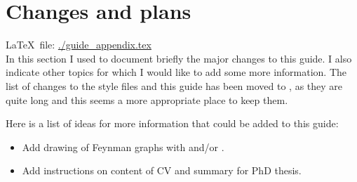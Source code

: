 
\chapter{Changes and plans}%
\label{sec:app:changes}

\LaTeX\ file: \url{./guide_appendix.tex}\\[1ex]
\noindent
In this section I used to document briefly the major changes to this guide.
I also indicate other topics for which I would like to add some more information.
The list of changes to the style files and this guide has been moved to ,
as they are quite long and this seems a more appropriate place to keep them.

Here is a list of ideas for more information that could be added to
this guide:
\begin{itemize}
\item Add drawing of Feynman graphs with  and/or
  .
\item Add instructions on content of CV and summary for PhD thesis.
\end{itemize}



















